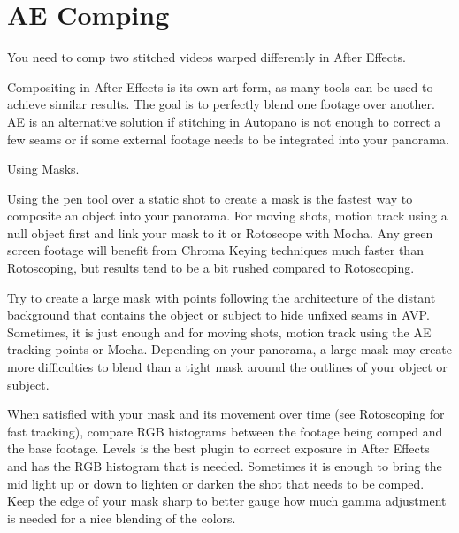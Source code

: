 \chapter{AE Comping}
\pagecolor{white}
\label{chap:51}
\begin{fullwidth}

\problem

{\large You need to comp two stitched videos warped differently in After Effects. \par}

Compositing in After Effects is its own art form, as many tools can be used to achieve similar results. The goal is to perfectly blend one footage over another. AE is an alternative solution if stitching in Autopano is not enough to correct a few seams or if some external footage needs to be integrated into your panorama.  

\solution

{\large Using Masks. \par}

Using the pen tool over a static shot to create a mask is the fastest way to composite an object into your panorama. For moving shots, motion track using a null object first and link your mask to it or Rotoscope with Mocha. Any green screen footage will benefit from Chroma Keying techniques much faster than Rotoscoping, but results tend to be a bit rushed compared to Rotoscoping.


Try to create a large mask with points following the architecture of the distant background that contains the object or subject to hide unfixed seams in AVP. Sometimes, it is just enough and for moving shots, motion track using the AE tracking points or Mocha. Depending on your panorama, a large mask may create more difficulties to blend than a tight mask around the outlines of your object or subject. 


When satisfied with your mask and its movement over time (see Rotoscoping for fast tracking), compare RGB histograms between the footage being comped and the base footage. Levels is the best plugin to correct exposure in After Effects and has the RGB histogram that is needed. Sometimes it is enough to bring the mid light up or down to lighten or darken the shot that needs to be comped. Keep the edge of your mask sharp to better gauge how much gamma adjustment is needed for a nice blending of the colors.


\end{fullwidth}
